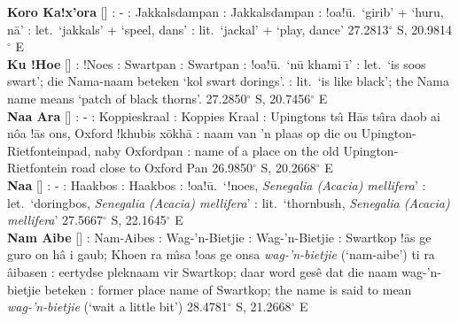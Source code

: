 \textbf{Koro Ka!x'ora} [] : -
: Jakkalsdampan : Jakkalsdampan
: !oa!\={u}.\ `\textvertline{}girib' +
`\textvertline{}huru, \textdoublebarpipe{}n\={a}' :
let.\ `jakkals' + `speel, dans' : lit.\ `jackal' +
`play, dance' 27.2813$^{\circ}$ S, 20.9814$^{\circ}$ E \\

\textbf{Ku !Hoe} [] : !Noes
: Swartpan : Swartpan :
!oa!\={u}.\ `\textdoublebarpipe{}n\={u} khami \={\i}' :
let.\ `is soos swart'; die Nama-naam beteken `kol swart dorings'.
: lit.\ `is like black'; the Nama name means `patch of
black thorns'. 27.2850$^{\circ}$ S, 20.7456$^{\circ}$ E \\

\textbf{N\textvertline{}aa \textdoublebarpipe{}Ara}
[]
: - : Koppieskraal :
Koppies Kraal : Upingtons ts\^{\i}
\textdoublevertline{}H\={a}s ts\^{\i}ra daob ai
\textdoublebarpipe{}n\^{o}a !\={a}s \textvertline{}ons, Oxford !khubis
x\={o}\textvertline{}kh\={a} : naam van 'n plaas op die
ou Upington-Rietfonteinpad, naby Oxfordpan : name of a
place on the old Upington-Rietfontein road close to Oxford Pan
26.9850$^{\circ}$ S, 20.2668$^{\circ}$ E \\

\textbf{N\textdoublevertline{}aa}
[] : -
: Haakbos : Haakbos :
!oa!\={u}.\ `!noes, \emph{Senegalia (Acacia) mellifera}' :
let.\ `doringbos, \emph{Senegalia (Acacia) mellifera}' : lit.\
`thornbush, \emph{Senegalia (Acacia) mellifera}' 27.5667$^{\circ}$ S,
22.1645$^{\circ}$ E \\

\textbf{N\textdoublevertline{}am Aibe}
[] :
\textdoublevertline{}Nam-Aibes : Wag-'n-Bietjie
: Wag-'n-Bietjie \underbar{Nama}: Swartkop !\={a}s ge
\textdoublebarpipe{}guro \textvertline{}on h\^{a} i
\textvertline{}gaub; Khoen ra m\^{\i}sa !oas ge \textvertline{}onsa
\emph{wag-'n-bietjie} (`\textdoublevertline{}nam-aibe') ti ra
\textdoublebarpipe{}\^{a}ibasen : eertydse pleknaam vir
Swartkop; daar word ges\^{e} dat die naam wag-'n-bietjie beteken
\underbar{Eng}: former place name of Swartkop; the name is said to
mean \emph{wag-'n-bietjie} (`wait a little bit') 28.4781$^{\circ}$ S,
21.2668$^{\circ}$ E\\

